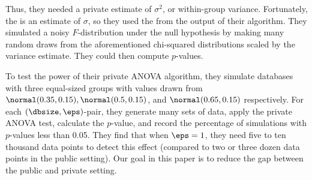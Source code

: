 Thus, they needed a private estimate of $\sigma^2$, or within-group variance. Fortunately, the \sse is an estimate of $\sigma$, so they used the \sse from the output of their algorithm. They simulated a noisy $F$-distribution under the null hypothesis by making many random draws from the aforementioned chi-squared distributions scaled by the variance estimate. They could then compute $p$-values.


To test the power of their private ANOVA algorithm, they simulate databases with three equal-sized groups with values drawn from $\normal(0.35, 0.15), \normal(0.5, 0.15)$, and $\normal(0.65, 0.15)$ respectively. For each $(\dbsize,\eps)$-pair, they generate many sets of data, apply the private ANOVA test, calculate the $p$-value, and record the percentage of simulations with $p$-values less than 0.05. They find that when $\eps = 1$, they need five to ten thousand data points to detect this effect (compared to two or three dozen data points in the public setting).  Our goal in this paper is to reduce the gap between the public and private setting.


